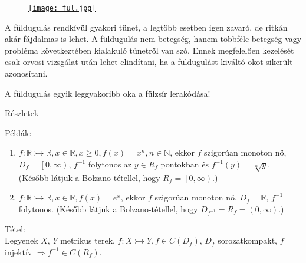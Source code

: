 \documentclass[12pt,a4paper]{scrartcl}
\providecommand{\tightlist}{%
  \setlength{\itemsep}{0pt}\setlength{\parskip}{0pt}}
\newenvironment{tetel}{}{}
\newenvironment{pelda}{}{}
\newenvironment{ajanlofig}{\begin{figure}\begin{center}}{
\end{center}\end{figure}}
\begin{document}
\begin{ajanlo}

\begin{ajanlofig}

\href{http://www.webbeteg.hu/cikkek/ful-orr-gegeszet/12276/a-fuldugulas-okai}{\texttt{[image: ful.jpg]}}

\end{ajanlofig}

A füldugulás rendkívül gyakori tünet, a legtöbb esetben igen zavaró, de
ritkán akár fájdalmas is lehet. A füldugulás nem betegség, hanem
többféle betegség vagy probléma következtében kialakuló tünetről van
szó. Ennek megfelelően kezelését csak orvosi vizsgálat után lehet
elindítani, ha a füldugulást kiváltó okot sikerült azonosítani.

A füldugulás egyik leggyakoribb oka a fülzsír lerakódása!

\href{http://www.webbeteg.hu/cikkek/ful-orr-gegeszet/12276/a-fuldugulas-okai}{Részletek}

\end{ajanlo}

\begin{pelda}

Példák:

\begin{enumerate}
\def\labelenumi{\arabic{enumi}.}
\tightlist
\item
  \(\left. f:{\mathbb{R}}\rightarrowtail{\mathbb{R}},x \in {\mathbb{R}},x \geq 0,f\left( x \right) = x^{n},n \in {\mathbb{N}} \right.\),
  ekkor \(f\) szigorúan monoton nő,
  \(D_{f} = \left\lbrack {0,\infty} \right)\), \(f^{- 1}\) folytonos az
  \(y \in R_{f}\) pontokban és
  \(f^{- 1}\left( y \right) = \sqrt[n]{y}\). (Később látjuk a
  \protect\hyperlink{bolzanotetel}{Bolzano-tétellel}, hogy
  \(R_{f} = \left\lbrack {0,\infty} \right)\).)
\item
  \(\left. f:{\mathbb{R}}\rightarrowtail{\mathbb{R}},x \in {\mathbb{R}},f\left( x \right) = e^{x} \right.\),
  ekkor \(f\) szigorúan monoton nő, \(D_{f} = {\mathbb{R}}\),
  \(f^{- 1}\) folytonos. (Később látjuk a
  \protect\hyperlink{bolzanotetel}{Bolzano-tétellel}, hogy
  \(D_{f^{- 1}} = R_{f} = \left( {0,\infty} \right)\).)
\end{enumerate}

\end{pelda}

\begin{tetel}

Tétel:\\
Legyenek \(X\), \(Y\) metrikus terek,
\(\left. f:X\rightarrowtail Y,f \in C\left( D_{f} \right) \right.\),
\(D_{f}\) sorozatkompakt, \(f\) injektív
\(\left. \Rightarrow f^{- 1} \in C\left( R_{f} \right) \right.\).

\end{tetel}
\end{document}
